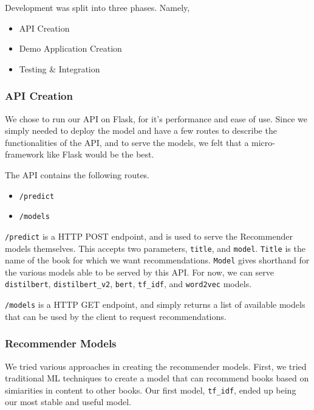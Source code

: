 Development was split into three phases. Namely,
\begin{itemize}
    \item API Creation
    \item Demo Application Creation
    \item Testing \& Integration
\end{itemize}

\subsubsection{API Creation}
We chose to run our API on Flask, for it's performance and ease of use. Since we simply needed to deploy the model and have a few routes to describe the functionalities of the API, and to serve the models, we felt that a micro-framework like Flask would be the best.

The API contains the following routes.
\begin{itemize}[label={}]
    \item \texttt{/predict}
    \item \texttt{/models}
\end{itemize}

\texttt{/predict} is a HTTP POST endpoint, and is used to serve the Recommender models themselves. This accepts two parameters, \texttt{title}, and \texttt{model}. \texttt{Title} is the name of the book for which we want recommendations. \texttt{Model} gives shorthand for the various models able to be served by this API. For now, we can serve \texttt{distilbert}, \texttt{distilbert\_v2}, \texttt{bert}, \texttt{tf\_idf}, and \texttt{word2vec} models.

\texttt{/models} is a HTTP GET endpoint, and simply returns a list of available models that can be used by the client to request recommendations.

\subsubsection*{Recommender Models}
We tried various approaches in creating the recommender models. First, we tried traditional ML techniques to create a model that can recommend books based on simiarities in content to other books. Our first model, \texttt{tf\_idf}, ended up being our most stable and useful model.

